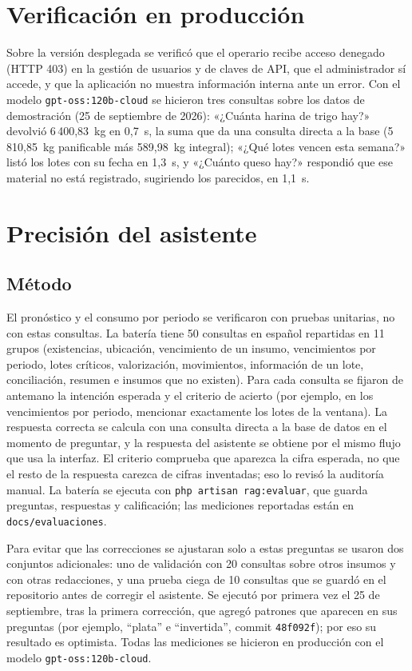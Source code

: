 \section{Verificación en producción}
\label{sec:pru_produccion}

Sobre la versión desplegada se verificó que el operario recibe acceso denegado (HTTP 403) en la gestión de usuarios y de claves de API, que el administrador sí accede, y que la aplicación no muestra información interna ante un error. Con el modelo \texttt{gpt-oss:120b-cloud} se hicieron tres consultas sobre los datos de demostración (25 de septiembre de 2026): «¿Cuánta harina de trigo hay?» devolvió 6\,400,83~kg en 0,7~s, la suma que da una consulta directa a la base (5\,810,85~kg panificable más 589,98~kg integral); «¿Qué lotes vencen esta semana?» listó los lotes con su fecha en 1,3~s, y «¿Cuánto queso hay?» respondió que ese material no está registrado, sugiriendo los parecidos, en 1,1~s.

\section{Precisión del asistente}
\label{sec:pru_asistente}

\subsection{Método}
El pronóstico y el consumo por periodo se verificaron con pruebas unitarias, no con estas consultas. La batería tiene 50 consultas en español repartidas en 11 grupos (existencias, ubicación, vencimiento de un insumo, vencimientos por periodo, lotes críticos, valorización, movimientos, información de un lote, conciliación, resumen e insumos que no existen). Para cada consulta se fijaron de antemano la intención esperada y el criterio de acierto (por ejemplo, en los vencimientos por periodo, mencionar exactamente los lotes de la ventana). La respuesta correcta se calcula con una consulta directa a la base de datos en el momento de preguntar, y la respuesta del asistente se obtiene por el mismo flujo que usa la interfaz. El criterio comprueba que aparezca la cifra esperada, no que el resto de la respuesta carezca de cifras inventadas; eso lo revisó la auditoría manual. La batería se ejecuta con \texttt{php artisan rag:evaluar}, que guarda preguntas, respuestas y calificación; las mediciones reportadas están en \texttt{docs/evaluaciones}.

Para evitar que las correcciones se ajustaran solo a estas preguntas se usaron dos conjuntos adicionales: uno de validación con 20 consultas sobre otros insumos y con otras redacciones, y una prueba ciega de 10 consultas que se guardó en el repositorio antes de corregir el asistente. Se ejecutó por primera vez el 25 de septiembre, tras la primera corrección, que agregó patrones que aparecen en sus preguntas (por ejemplo, ``plata'' e ``invertida'', commit \texttt{48f092f}); por eso su resultado es optimista. Todas las mediciones se hicieron en producción con el modelo \texttt{gpt-oss:120b-cloud}.

